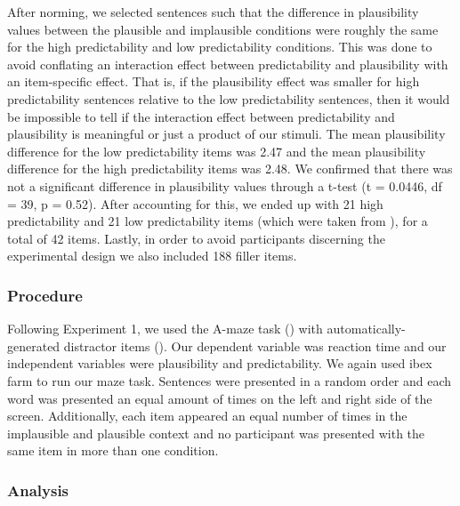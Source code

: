 \documentclass[
  12pt,
  letterpaper,
]{scrreprt}
\begin{document}
After norming, we selected sentences such that the difference in
plausibility values between the plausible and implausible conditions
were roughly the same for the high predictability and low predictability
conditions. This was done to avoid conflating an interaction effect
between predictability and plausibility with an item-specific effect.
That is, if the plausibility effect was smaller for high predictability
sentences relative to the low predictability sentences, then it would be
impossible to tell if the interaction effect between predictability and
plausibility is meaningful or just a product of our stimuli. The mean
plausibility difference for the low predictability items was 2.47 and
the mean plausibility difference for the high predictability items was
2.48. We confirmed that there was not a significant difference in
plausibility values through a t-test (t = 0.0446, df = 39, p = 0.52).
After accounting for this, we ended up with 21 high predictability and
21 low predictability items (which were taken from
), for
a total of 42 items. Lastly, in order to avoid participants discerning
the experimental design we also included 188 filler items.

\subsubsection{Procedure}\label{procedure-1}

Following Experiment 1, we used the A-maze task
() with
automatically-generated distractor items
(). Our dependent variable was reaction time and our independent
variables were plausibility and predictability. We again used ibex farm
to run our maze task. Sentences were presented in a random order and
each word was presented an equal amount of times on the left and right
side of the screen. Additionally, each item appeared an equal number of
times in the implausible and plausible context and no participant was
presented with the same item in more than one condition.

\subsubsection{Analysis}\label{analysis-1}
\end{document}
